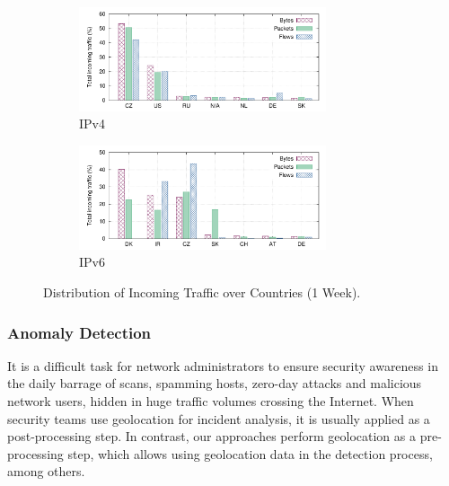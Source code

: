 \begin{figure}[!tb]
    \centering
    \begin{subfigure}[t]{\textwidth}
        \centering
        \includegraphics[width=0.8\textwidth]{figures/paper-geolocation/ipv4-ctry-breakdown/ipv4-ctry-breakdown-in}
        \caption{IPv4}
        \label{fig:geo-ipv4-traffic}
    \end{subfigure}%
    \hfill
    \begin{subfigure}[t]{\textwidth}
        \centering
        \includegraphics[width=0.8\textwidth]{figures/paper-geolocation/ipv6-ctry-breakdown/ipv6-ctry-breakdown-in}
        \caption{IPv6}
        \label{fig:geo-ipv6-traffic}
    \end{subfigure}
    \caption{Distribution of Incoming Traffic over Countries (1 Week).}
    \label{fig:geo-ip_ctry_breakdown}
\end{figure}

\subsubsection{Anomaly Detection}

It is a difficult task for network administrators to ensure security awareness in the daily barrage of scans, spamming hosts, zero-day attacks and malicious network users, hidden in huge traffic volumes crossing the Internet. When security teams use geolocation for incident analysis, it is usually applied as a post-processing step. In contrast, our approaches perform geolocation as a pre-processing step, which allows using geolocation data in the detection process, among others.


